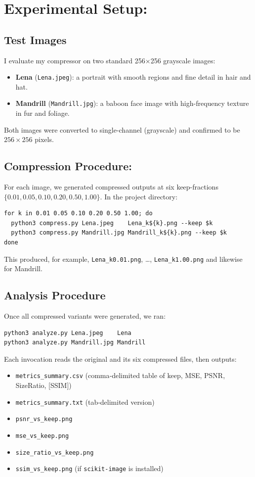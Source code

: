 \documentclass[12pt]{article}
\begin{document}
\section{Experimental Setup:}
\subsection{Test Images}
I evaluate my compressor on two standard 256×256 grayscale images:
\begin{itemize}
  \item \textbf{Lena} (\texttt{Lena.jpeg}): a portrait with smooth regions and fine detail in hair and hat.  
  \item \textbf{Mandrill} (\texttt{Mandrill.jpg}): a baboon face image with high-frequency texture in fur and foliage.
\end{itemize}

\noindent Both images were converted to single-channel (grayscale) and confirmed to be $256 \times 256$ pixels.

\subsection{Compression Procedure:}
For each image, we generated compressed outputs at six keep-fractions
\\ \(\{0.01,0.05,0.10,0.20,0.50,1.00\}\). In the project directory:
\begin{verbatim}
for k in 0.01 0.05 0.10 0.20 0.50 1.00; do
  python3 compress.py Lena.jpeg    Lena_k${k}.png --keep $k
  python3 compress.py Mandrill.jpg Mandrill_k${k}.png --keep $k
done
\end{verbatim}
This produced, for example, \texttt{Lena\_k0.01.png}, …, \texttt{Lena\_k1.00.png} and likewise for Mandrill.

\subsection{Analysis Procedure}
Once all compressed variants were generated, we ran:
\begin{verbatim}
python3 analyze.py Lena.jpeg    Lena
python3 analyze.py Mandrill.jpg Mandrill
\end{verbatim}
Each invocation reads the original and its six compressed files, then outputs:
\begin{itemize}
  \item \texttt{metrics\_summary.csv}  (comma‐delimited table of keep, MSE, PSNR, SizeRatio, [SSIM])  
  \item \texttt{metrics\_summary.txt}  (tab‐delimited version)  
  \item \texttt{psnr\_vs\_keep.png}  
  \item \texttt{mse\_vs\_keep.png}  
  \item \texttt{size\_ratio\_vs\_keep.png}  
  \item \texttt{ssim\_vs\_keep.png} (if \texttt{scikit-image} is installed)  
\end{itemize}
\end{document}
